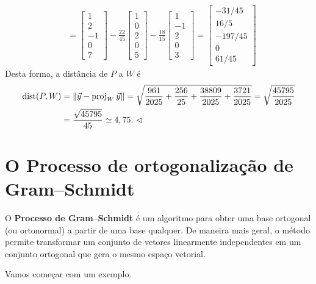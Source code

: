 \begin{ex}
\begin{align*}
   & = \begin{bmatrix}
1 \\ 2 \\ -1 \\ 0 \\ 7
\end{bmatrix} - \frac{22}{45}
\begin{bmatrix}
1 \\ 0 \\ 2 \\ 0 \\ 5
\end{bmatrix} - \frac{18}{15}
\begin{bmatrix}
1 \\ -1 \\ 2 \\ 0 \\ 3
\end{bmatrix} =
\begin{bmatrix}
-31/45 \\ 16/5 \\ -197/45 \\ 0 \\ 61/45
\end{bmatrix}
  \end{align*}
  Desta forma, a distância de $P$ a $W$ é
  \begin{align*}
\operatorname{dist} (P,W) & = \|\vec{y} - \operatorname{proj}_{W} \vec{y}\| = \sqrt{\frac{961}{2025} + \frac{256}{25} + \frac{38809}{2025} + \frac{3721}{2025}} = \sqrt{\frac{ 45795 }{2025}} \\
           & = \frac{ \sqrt{45795} }{45} \simeq 4,75. \ \lhd
  \end{align*}
\end{ex}




\section{O Processo de ortogonalização de Gram--Schmidt}

O \textbf{Processo de Gram--Schmidt} é um algoritmo para obter uma base ortogonal (ou ortonormal) a partir de uma base qualquer. De maneira mais geral, o método permite transformar um conjunto de vetores linearmente independentes em um conjunto ortogonal que gera o mesmo espaço vetorial.

Vamos começar com um exemplo.

